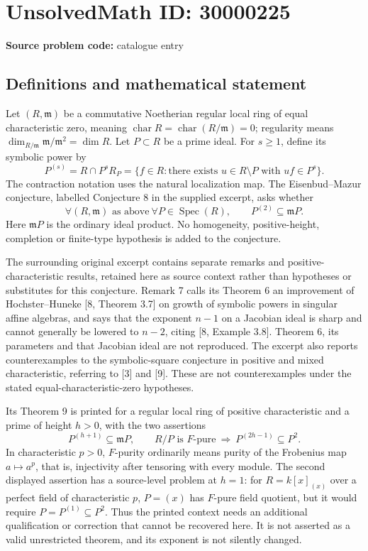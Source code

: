 \documentclass[11pt]{article}
\begin{document}
\section*{UnsolvedMath ID: 30000225}
\textbf{Source problem code:} catalogue entry
\subsection{Definitions and mathematical statement}
Let \((R,\mathfrak m)\) be a commutative Noetherian regular local ring of equal characteristic zero, meaning \(\operatorname{char}R=\operatorname{char}(R/\mathfrak m)=0\); regularity means \(\dim_{R/\mathfrak m}\mathfrak m/\mathfrak m^2=\dim R\). Let \(P\subset R\) be a prime ideal. For \(s\geq1\), define its symbolic power by
\[
 P^{(s)}=R\cap P^sR_P
 =\{f\in R:\text{there exists }u\in R\setminus P\text{ with }uf\in P^s\}.
\]
The contraction notation uses the natural localization map. The Eisenbud--Mazur conjecture, labelled Conjecture 8 in the supplied excerpt, asks whether
\[
 \forall (R,\mathfrak m)\text{ as above}\ \forall P\in\operatorname{Spec}(R),
 \qquad P^{(2)}\subseteq\mathfrak mP.
\]
Here \(\mathfrak mP\) is the ordinary ideal product. No homogeneity, positive-height, completion or finite-type hypothesis is added to the conjecture.

The surrounding original excerpt contains separate remarks and positive-characteristic results, retained here as source context rather than hypotheses or substitutes for this conjecture. Remark 7 calls its Theorem 6 an improvement of Hochster--Huneke [8, Theorem 3.7] on growth of symbolic powers in singular affine algebras, and says that the exponent \(n-1\) on a Jacobian ideal is sharp and cannot generally be lowered to \(n-2\), citing [8, Example 3.8]. Theorem 6, its parameters and that Jacobian ideal are not reproduced. The excerpt also reports counterexamples to the symbolic-square conjecture in positive and mixed characteristic, referring to [3] and [9]. These are not counterexamples under the stated equal-characteristic-zero hypotheses.

Its Theorem 9 is printed for a regular local ring of positive characteristic and a prime of height \(h>0\), with the two assertions
\[
 P^{(h+1)}\subseteq\mathfrak mP,\qquad
 R/P\text{ is }F\text{-pure}\ \Longrightarrow\ P^{(2h-1)}\subseteq P^2.
\]
In characteristic \(p>0\), \(F\)-purity ordinarily means purity of the Frobenius map \(a\mapsto a^p\), that is, injectivity after tensoring with every module. The second displayed assertion has a source-level problem at \(h=1\): for \(R=k[x]_{(x)}\) over a perfect field of characteristic \(p\), \(P=(x)\) has \(F\)-pure field quotient, but it would require \(P=P^{(1)}\subseteq P^2\). Thus the printed context needs an additional qualification or correction that cannot be recovered here. It is not asserted as a valid unrestricted theorem, and its exponent is not silently changed.
\end{document}
